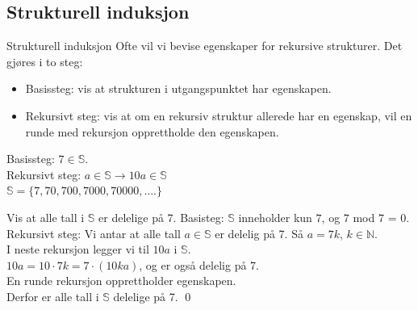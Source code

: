 \subsection{Strukturell induksjon}
\begin{frame}{Strukturell induksjon}
    Ofte vil vi bevise egenskaper for rekursive strukturer. Det gjøres i to steg:
    \begin{itemize}
        \item Basissteg: vis at strukturen i utgangspunktet har egenskapen.
        \item Rekursivt steg: vis at om en rekursiv struktur allerede har en egenskap, vil en runde med rekursjon opprettholde den egenskapen.
    \end{itemize}
    
    \pause
    \begin{block}{}
        Basissteg: $7 \in \mathbb{S}$.\\
        Rekursivt steg: $a \in \mathbb{S} \rightarrow 10a \in \mathbb{S}$\\
        $\mathbb{S} = \{7, 70, 700, 7000, 70000, ....\}$
    \end{block}
    \begin{block}{Vis at alle tall i $\mathbb{S}$ er delelige på 7.}
        \pause
        Basisteg: $\mathbb{S}$ inneholder kun $7$, og $7$ mod $7$ = 0. \checkmark\\
        \pause
        Rekursivt steg: Vi antar at alle tall $a \in \mathbb{S}$ er delelig på 7. Så $a = 7k$, $k \in \mathbb{N}$.\\
        \pause
        I neste rekursjon legger vi til $10a$ i $\mathbb{S}$.\\
        \pause
        $10a=10 \cdot 7k = 7 \cdot (10ka)$, og er også delelig på 7.\\
        \pause
        En runde rekursjon opprettholder egenskapen. \checkmark\\
        \pause
        Derfor er alle tall i $\mathbb{S}$ delelige på 7. \qed
    \end{block}
\end{frame}

